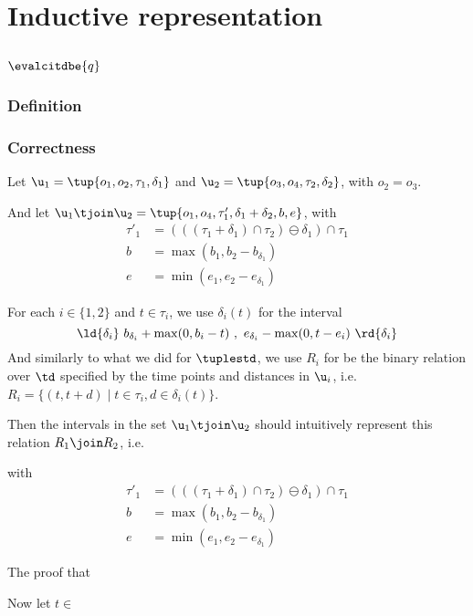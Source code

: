 
\section{Inductive representation}
\label{sec:inductive}


\subsection{$\evalcitdbe{q}$}

\subsubsection{Definition}
\label{sec:evalbe_def}

\subsubsection{Correctness}
\label{sec:evalbe_correct}

Let $\u_1 = \tup{o_1, o_2, \tau_1, \delta_1}$ and $\u_2 = \tup{o_3, o_4, \tau_2, \delta_2}$,
with $o_2 = o_3$.

And let  $\u_1 \tjoin \u_2 = \tup{o_1, o_4, \tau'_1, \delta_1 + \delta_2, b,e}$,
with
\begin{align*}
\tau'_1 &=  (((\tau_1 + \delta_1) \cap \tau_2) \ominus \delta_1) \cap \tau_1\\
  b &= \max(b_1, b_2 - b_{\delta_1})\\
  e &= \min(e_1, e_2 - e_{\delta_1})
\end{align*}



For each $i \in \{1,2\}$ and $t \in \tau_i$,
we use $\delta_i(t)$ for the interval
\[\ld{\delta_{i}}\ b_{\delta_i} + \max(0, b_i - t) \ ,\ e_{\delta_i} - \max(0, t - e_i)\ \rd{\delta_{i}}\]
And similarly to what we did for $\tuplestd$,
we use $R_i$ for be the binary relation over $\td$ specified by the time points and distances in $\u_i$,
i.e.~$R_i = \{(t,t + d) \mid t \in \tau_i, d \in \delta_i(t)\}$.

Then the intervals in the set $\u_1 \tjoin \u_2$ should intuitively represent this relation $R_1 \join R_2$, i.e.

with
\begin{align*}
\tau'_1 &=  (((\tau_1 + \delta_1) \cap \tau_2) \ominus \delta_1) \cap \tau_1\\
  b &= \max(b_1, b_2 - b_{\delta_1})\\
  e &= \min(e_1, e_2 - e_{\delta_1})
\end{align*}


The proof that 

Now let $t \in $



